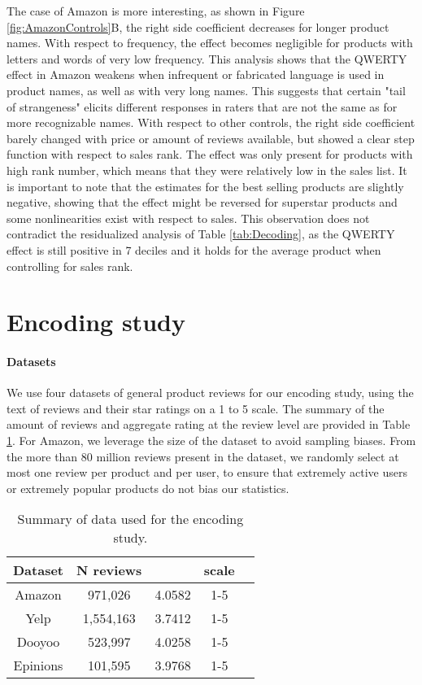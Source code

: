 \documentclass[letterpaper]{sig-alternate-2013}
\begin{document}
The case of Amazon is more interesting, as shown in Figure
\ref{fig:AmazonControls}B, the right side coefficient decreases for longer
product names. With respect to frequency, the effect becomes negligible for
products with letters and words of very low frequency. This analysis shows
that the QWERTY effect in Amazon weakens when infrequent or fabricated
language is used in product names, as well as with very long names. This
suggests that certain "tail of strangeness" elicits different responses in
raters that are not the same as for more recognizable names. With respect to
other controls, the right side coefficient  barely changed with price
or amount of reviews available, but showed a clear step function with respect
to sales rank. The effect was only present for products with  high rank
number, which means that they  were relatively low in the sales list. It is
important to note that the estimates for the best selling products are
slightly negative, showing that the effect might be reversed for superstar
products and some nonlinearities exist with respect to sales. This observation
does not contradict the residualized analysis of Table \ref{tab:Decoding}, as
the QWERTY effect is still positive in 7 deciles and it holds for the average
product when controlling for sales rank.

\section{Encoding study}
\label{sec:encoding}
\paragraph{Datasets}

We use four datasets of general product reviews for our encoding study,
using the text of reviews and their star ratings on a 1 to 5 scale. The
summary of the amount of reviews and aggregate rating at the review level are
provided in Table \ref{tab:data2}. For Amazon, we leverage the size of the dataset to avoid sampling
biases. From the more than 80 million reviews present in the dataset, we
randomly select at most one review per product and per user, to ensure that
extremely active users or extremely popular products do not bias our
statistics.

\begin{table}[hp]
\begin{center}
    \begin{tabular}{c|c|c|c|c}
	Dataset &   N reviews   &  & scale  \\ \hline
	Amazon & 971,026 & 4.0582 & 1-5 \\
	Yelp & 1,554,163 & 3.7412 & 1-5 \\
	Dooyoo & 523,997 &  4.0258 & 1-5 \\
	Epinions & 101,595 & 3.9768 & 1-5
	  \end{tabular}
\end{center}
  \caption{Summary of data used for the encoding study. \label{tab:data2}}
\end{table}
\end{document}

